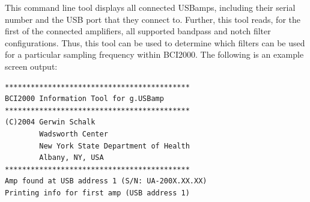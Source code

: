\documentclass[letterpaper, oneside, 12pt]{article}
\begin{document}
This command line tool displays all connected USBamps, including their serial 
number and the USB port that they connect to. Further, this tool reads, for the 
first of the connected amplifiers, all supported bandpass and notch filter 
configurations. Thus, this tool can be used to determine which filters can be 
used for a particular sampling frequency within BCI2000. The following is an 
example screen output:

\begin{verbatim}
*******************************************
BCI2000 Information Tool for g.USBamp
*******************************************
(C)2004 Gerwin Schalk
        Wadsworth Center
        New York State Department of Health
        Albany, NY, USA
*******************************************
Amp found at USB address 1 (S/N: UA-200X.XX.XX)
Printing info for first amp (USB address 1)


\end{verbatim}
\end{document}
